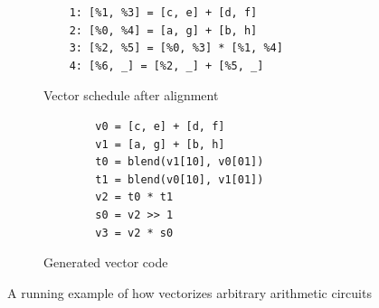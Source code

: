 \begin{figure}
\begin{subfigure}{0.4\columnwidth}
    \end{subfigure}
    \begin{subfigure}{0.45\columnwidth}
        \begin{verbatim}
    1: [%1, %3] = [c, e] + [d, f]
    2: [%0, %4] = [a, g] + [b, h]
    3: [%2, %5] = [%0, %3] * [%1, %4]
    4: [%6, _] = [%2, _] + [%5, _]
        \end{verbatim}
        \vspace{-1em}
        \caption{Vector schedule after alignment}
        \label{fig:aligned-schedule}
    \end{subfigure}
    \begin{subfigure}{0.45\columnwidth}
        \begin{verbatim}
        v0 = [c, e] + [d, f]
        v1 = [a, g] + [b, h]
        t0 = blend(v1[10], v0[01])
        t1 = blend(v0[10], v1[01])
        v2 = t0 * t1
        s0 = v2 >> 1
        v3 = v2 * s0
        \end{verbatim}
        \vspace{-1em}
        \caption{Generated vector code}
        \label{fig:generated-code}
    \end{subfigure}
\vspace{-1em}
    \caption{A running example of how \system vectorizes arbitrary arithmetic circuits}
    \label{fig:toy-running-example}
\end{figure}

